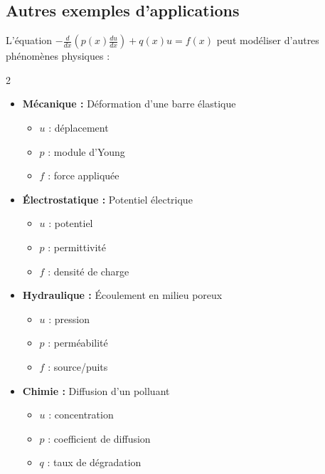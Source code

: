 \documentclass[11pt,a4paper]{report}
\begin{document}
\subsection*{Autres exemples d'applications}

L'équation $- \frac{d}{dx} \left( p(x) \frac{du}{dx} \right) + q(x) u = f(x)$ peut modéliser d'autres phénomènes physiques :

\vspace{-0.5em}
\begin{multicols}{2}
\setlength{\columnsep}{1.5em}
\begin{itemize}[label=,leftmargin=0pt,itemsep=0.3em]
    \item \textbf{Mécanique :} Déformation d'une barre élastique
    \begin{itemize}[label=$\bullet$,leftmargin=1em,itemsep=0.1em]
        \item $u$ : déplacement
        \item $p$ : module d'Young
        \item $f$ : force appliquée
    \end{itemize}
    
    \item \textbf{Électrostatique :} Potentiel électrique
    \begin{itemize}[label=$\bullet$,leftmargin=1em,itemsep=0.1em]
        \item $u$ : potentiel
        \item $p$ : permittivité
        \item $f$ : densité de charge
    \end{itemize}
    
    \item \textbf{Hydraulique :} Écoulement en milieu poreux
    \begin{itemize}[label=$\bullet$,leftmargin=1em,itemsep=0.1em]
        \item $u$ : pression
        \item $p$ : perméabilité
        \item $f$ : source/puits
    \end{itemize}
    
    \item \textbf{Chimie :} Diffusion d'un polluant
    \begin{itemize}[label=$\bullet$,leftmargin=1em,itemsep=0.1em]
        \item $u$ : concentration
        \item $p$ : coefficient de diffusion
        \item $q$ : taux de dégradation
    \end{itemize}
\end{itemize}
\end{multicols}
\end{document}
